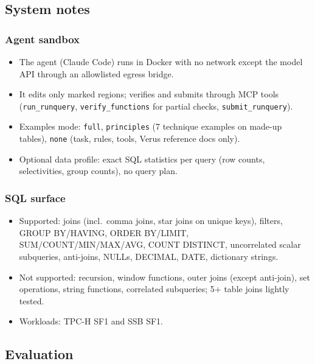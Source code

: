 \documentclass[
  10pt,
]{article}
\newcounter{none} %
\providecommand{\tightlist}{%
  \setlength{\itemsep}{0pt}\setlength{\parskip}{0pt}}
\begin{document}
\subsection{System notes}\label{system-notes}

\subsubsection{Agent sandbox}\label{agent-sandbox}

\begin{itemize}
\tightlist
\item
  The agent (Claude Code) runs in Docker with no network except the
  model API through an allowlisted egress bridge.
\item
  It edits only marked regions; verifies and submits through MCP tools
  (\texttt{run\_runquery}, \texttt{verify\_functions} for partial
  checks, \texttt{submit\_runquery}).
\item
  Examples mode: \texttt{full}, \texttt{principles} (7 technique
  examples on made-up tables), \texttt{none} (task, rules, tools, Verus
  reference docs only).
\item
  Optional data profile: exact SQL statistics per query (row counts,
  selectivities, group counts), no query plan.
\end{itemize}

\subsubsection{SQL surface}\label{sql-surface}

\begin{itemize}
\tightlist
\item
  Supported: joins (incl.~comma joins, star joins on unique keys),
  filters, GROUP BY/HAVING, ORDER BY/LIMIT, SUM/COUNT/MIN/MAX/AVG, COUNT
  DISTINCT, uncorrelated scalar subqueries, anti-joins, NULLs, DECIMAL,
  DATE, dictionary strings.
\item
  Not supported: recursion, window functions, outer joins (except
  anti-join), set operations, string functions, correlated subqueries;
  5+ table joins lightly tested.
\item
  Workloads: TPC-H SF1 and SSB SF1.
\end{itemize}

\subsection{Evaluation}\label{evaluation}
\end{document}

